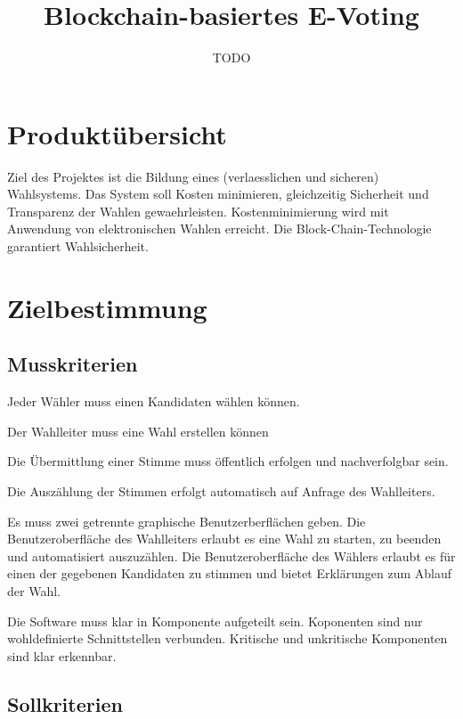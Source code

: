 \documentclass[parskip=full,11pt,twoside]{scrartcl}
\title{Blockchain-basiertes E-Voting}
\author{TODO}
\begin{document}
\maketitle

\pagebreak
\section{Produktübersicht}
Ziel des Projektes ist die Bildung eines (verlaesslichen und sicheren) Wahlsystems.  Das System soll Kosten minimieren, gleichzeitig Sicherheit und Transparenz der Wahlen gewaehrleisten. Kostenminimierung wird mit Anwendung von elektronischen Wahlen erreicht. Die Block-Chain-Technologie garantiert Wahlsicherheit.
\section{Zielbestimmung}

\subsection{Musskriterien}

Jeder Wähler muss einen Kandidaten wählen können.

Der Wahlleiter muss eine Wahl erstellen können

Die Übermittlung einer Stimme muss öffentlich erfolgen und nachverfolgbar sein.

Die Auszählung der Stimmen erfolgt automatisch auf Anfrage des Wahlleiters.

Es muss zwei getrennte graphische Benutzerberflächen geben. Die Benutzeroberfläche des Wahlleiters erlaubt es eine Wahl zu starten, zu beenden und automatisiert auszuzählen. Die Benutzeroberfläche des Wählers erlaubt es für einen der gegebenen Kandidaten zu stimmen und bietet Erklärungen zum Ablauf der Wahl. 

Die Software muss klar in Komponente aufgeteilt sein. Koponenten sind nur  wohldefinierte Schnittstellen verbunden.
Kritische und unkritische Komponenten sind klar erkennbar.

\subsection{Sollkriterien}
\end{document}
